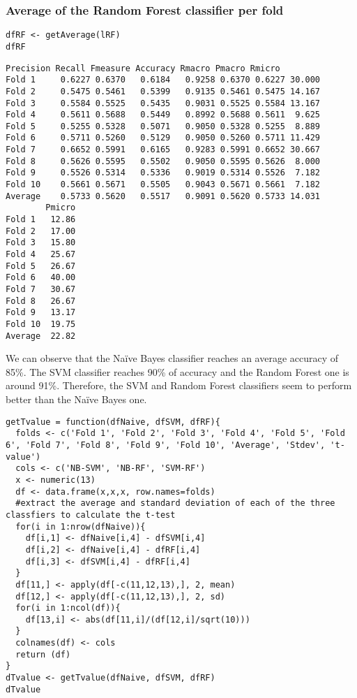 \documentclass[]{article}
\begin{document}
\subsubsection{Average of the Random Forest classifier per fold}

\begin{lstlisting}[frame=single]
dfRF <- getAverage(lRF)
dfRF
\end{lstlisting}

\begin{lstlisting}[frame=single]
        Precision Recall Fmeasure Accuracy Rmacro Pmacro Rmicro
Fold 1     0.6227 0.6370   0.6184   0.9258 0.6370 0.6227 30.000
Fold 2     0.5475 0.5461   0.5399   0.9135 0.5461 0.5475 14.167
Fold 3     0.5584 0.5525   0.5435   0.9031 0.5525 0.5584 13.167
Fold 4     0.5611 0.5688   0.5449   0.8992 0.5688 0.5611  9.625
Fold 5     0.5255 0.5328   0.5071   0.9050 0.5328 0.5255  8.889
Fold 6     0.5711 0.5260   0.5129   0.9050 0.5260 0.5711 11.429
Fold 7     0.6652 0.5991   0.6165   0.9283 0.5991 0.6652 30.667
Fold 8     0.5626 0.5595   0.5502   0.9050 0.5595 0.5626  8.000
Fold 9     0.5526 0.5314   0.5336   0.9019 0.5314 0.5526  7.182
Fold 10    0.5661 0.5671   0.5505   0.9043 0.5671 0.5661  7.182
Average    0.5733 0.5620   0.5517   0.9091 0.5620 0.5733 14.031
        Pmicro
Fold 1   12.86
Fold 2   17.00
Fold 3   15.80
Fold 4   25.67
Fold 5   26.67
Fold 6   40.00
Fold 7   30.67
Fold 8   26.67
Fold 9   13.17
Fold 10  19.75
Average  22.82
\end{lstlisting}

We can observe that the Naïve Bayes classifier reaches an average
accuracy of 85\%. The SVM classifier reaches 90\% of accuracy and the
Random Forest one is around 91\%. Therefore, the SVM and Random Forest
classifiers seem to perform better than the Naïve Bayes one.

\begin{lstlisting}[frame=single]
getTvalue = function(dfNaive, dfSVM, dfRF){
  folds <- c('Fold 1', 'Fold 2', 'Fold 3', 'Fold 4', 'Fold 5', 'Fold 6', 'Fold 7', 'Fold 8', 'Fold 9', 'Fold 10', 'Average', 'Stdev', 't-value')
  cols <- c('NB-SVM', 'NB-RF', 'SVM-RF')
  x <- numeric(13)
  df <- data.frame(x,x,x, row.names=folds)
  #extract the average and standard deviation of each of the three classfiers to calculate the t-test
  for(i in 1:nrow(dfNaive)){
    df[i,1] <- dfNaive[i,4] - dfSVM[i,4]
    df[i,2] <- dfNaive[i,4] - dfRF[i,4]
    df[i,3] <- dfSVM[i,4] - dfRF[i,4]
  }
  df[11,] <- apply(df[-c(11,12,13),], 2, mean)
  df[12,] <- apply(df[-c(11,12,13),], 2, sd)
  for(i in 1:ncol(df)){
    df[13,i] <- abs(df[11,i]/(df[12,i]/sqrt(10)))
  }
  colnames(df) <- cols
  return (df)
}
dTvalue <- getTvalue(dfNaive, dfSVM, dfRF)
dTvalue
\end{lstlisting}
\end{document}
